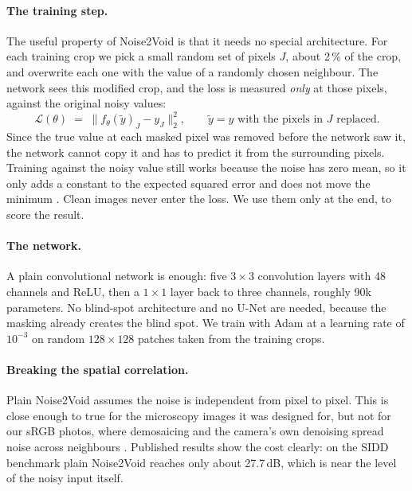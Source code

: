 \documentclass[11pt]{article}
\begin{document}
\paragraph{The training step.}
The useful property of Noise2Void is that it needs no special architecture. For each
training crop we pick a small random set of pixels $J$, about 2\,\% of the crop, and
overwrite each one with the value of a randomly chosen neighbour. The network sees this
modified crop, and the loss is measured \emph{only} at those pixels, against the original
noisy values:
\begin{equation}
\mathcal{L}(\theta) \;=\; \big\lVert f_\theta(\tilde{y})_J - y_J \big\rVert_2^2 ,
\qquad \tilde{y} = y \text{ with the pixels in } J \text{ replaced}.
\end{equation}
Since the true value at each masked pixel was removed before the network saw it, the
network cannot copy it and has to predict it from the surrounding pixels. Training against
the noisy value still works because the noise has zero mean, so it only adds a constant to
the expected squared error and does not move the minimum
\citep{lehtinen2018noise2noise}. Clean images never enter the loss. We use them only at the
end, to score the result.

\paragraph{The network.}
A plain convolutional network is enough: five $3\times3$ convolution layers with 48
channels and ReLU, then a $1\times1$ layer back to three channels, roughly 90k parameters.
No blind-spot architecture and no U-Net are needed, because the masking already creates the
blind spot. We train with Adam at a learning rate of $10^{-3}$ on random $128\times128$
patches taken from the training crops.

\paragraph{Breaking the spatial correlation.}
Plain Noise2Void assumes the noise is independent from pixel to pixel. This is close enough
to true for the microscopy images it was designed for, but not for our sRGB photos, where
demosaicing and the camera's own denoising spread noise across neighbours
\citep{zhou2020awgn}. Published results show the cost clearly: on the SIDD benchmark plain
Noise2Void reaches only about 27.7\,dB, which is near the level of the noisy input itself.
\end{document}
